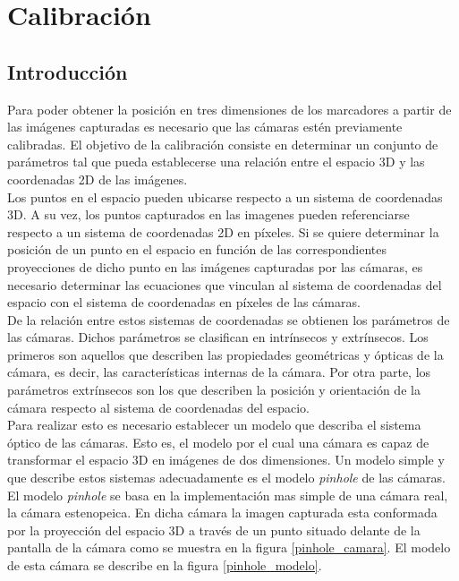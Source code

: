 

\section{Calibración}
\label{calibracion}

\subsection{Introducción}
Para poder obtener la posición en tres dimensiones de los marcadores a partir de las imágenes capturadas es necesario que las cámaras estén previamente calibradas. El objetivo de la calibración consiste en determinar un conjunto de parámetros tal que pueda establecerse una relación entre el espacio 3D y las coordenadas 2D de las imágenes.\\

Los puntos en el espacio pueden ubicarse respecto a un sistema de coordenadas 3D. A su vez, los puntos capturados en las imagenes pueden referenciarse respecto a un sistema de coordenadas 2D en píxeles. Si se quiere determinar la posición de un punto en el espacio en función de las correspondientes proyecciones de dicho punto en las imágenes capturadas por las cámaras, es necesario determinar las ecuaciones que vinculan al sistema de coordenadas del espacio con el sistema de coordenadas en píxeles de las cámaras.\\

De la relación entre estos sistemas de coordenadas se obtienen los parámetros de las cámaras. Dichos parámetros se clasifican en intrínsecos y extrínsecos. Los primeros son aquellos que describen las propiedades geométricas y ópticas de la cámara, es decir, las características internas de la cámara. Por otra parte, los parámetros extrínsecos son los que describen la posición y orientación de la cámara respecto al sistema de coordenadas del espacio.\\

Para realizar esto es necesario establecer un modelo que describa el sistema óptico de las cámaras. Esto es, el modelo por el cual una cámara es capaz de transformar el espacio 3D en imágenes de dos dimensiones. Un modelo simple y que describe estos sistemas adecuadamente es el modelo \textit{pinhole} de las cámaras. 
El modelo \textit{pinhole} se basa en la implementación mas simple de una cámara real, la cámara estenopeica. En dicha cámara la imagen capturada esta conformada por la proyección del espacio 3D a través de un punto situado delante de la pantalla de la cámara como se muestra en la figura \ref{pinhole_camara}. El modelo de esta cámara se describe en la figura \ref{pinhole_modelo}.\\

